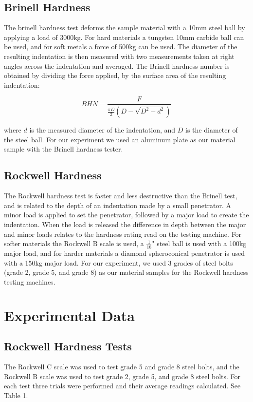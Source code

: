 \documentclass{article}
\begin{document}
\subsection{Brinell Hardness}
\label{Brinell Hardness}
The brinell hardness test deforms the sample material with a 10\si{mm} steel ball by applying a load of 3000\si{kg}. For hard materials a tungsten 10\si{mm} carbide ball can be used, and for soft metals a force of 500\si{kg} can be used. The diameter of the resulting indentation is then measured with two measurements taken at right angles across the indentation and averaged. The Brinell hardness number is obtained by dividing the force applied, by the surface area of the resulting indentation:
\begin{center}
\begin{equation}\label{eq:1}
    BHN = \frac{F}{\frac{\pi D}{2}(D-\sqrt{D^2-d^2})}
\end{equation}
\end{center}
where $d$ is the measured diameter of the indentation, and $D$ is the diameter of the steel ball. For our experiment we used an aluminum plate as our material sample with the Brinell hardness tester.


\subsection{Rockwell Hardness}
The Rockwell hardness test is faster and less destructive than the Brinell test, and is related to the depth of an indentation made by a small penetrator. A minor load is applied to set the penetrator, followed by a major load to create the indentation. When the load is released the difference in depth between the major and minor loads relates to the hardness rating read on the testing machine. For softer materials the Rockwell B scale is used, a $\frac{1}{16}$" steel ball is used with a 100\si{kg} major load, and for harder materials a diamond spheroconical penetrator is used with a 150\si{kg} major load. For our experiment, we used 3 grades of steel bolts (grade 2, grade 5, and grade 8) as our material samples for the Rockwell hardness testing machines.
 
 

\section{Experimental Data}
\subsection{Rockwell Hardness Tests}
The Rockwell C scale was used to test grade 5 and grade 8 steel bolts, and the Rockwell B scale was used to test grade 2, grade 5, and grade 8 steel bolts. For each test three trials were performed and their average readings calculated. See Table 1.
\end{document}

